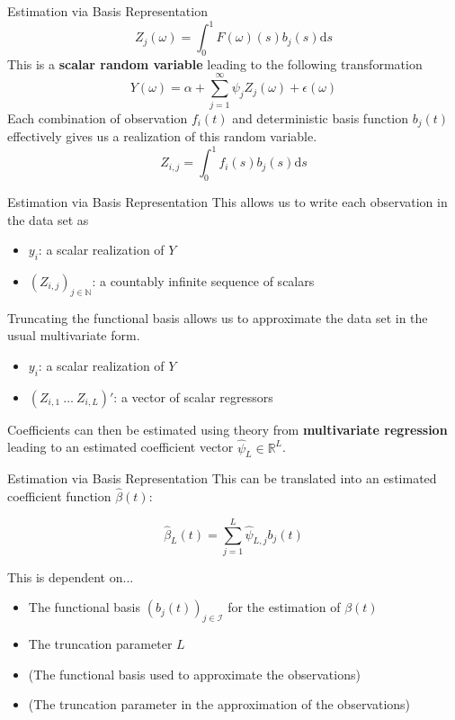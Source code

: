 \documentclass{beamer}
\begin{document}
	\begin{frame}{Estimation via Basis Representation}
		$$Z_j(\omega) = \int_{0}^{1} F(\omega)(s) b_j(s)\mathrm{d}s$$ 
		This is a \textbf{scalar random variable} leading to the following transformation
		$$Y(\omega) = \alpha + \sum_{j = 1}^{\infty} \psi_j Z_j(\omega) + \epsilon(\omega)$$
		Each combination of observation $f_i(t)$ and deterministic basis function $b_j(t)$ effectively gives us a realization of this random variable.
		$$Z_{i,j} = \int_{0}^{1} f_i(s) b_j(s)\mathrm{d}s$$
		
	\end{frame}

	\begin{frame}{Estimation via Basis Representation}
		This allows us to write each observation in the data set as
		\begin{itemize}
			\item $y_i$: a scalar realization of $Y$
			\item $\left(Z_{i,j}\right)_{j \in \mathbb{N}}$: a countably infinite sequence of scalars
		\end{itemize}
		\vspace{0.2cm}
		
		Truncating the functional basis allows us to approximate the data set in the usual multivariate form.
		\begin{itemize}
			\item $y_i$: a scalar realization of $Y$
			\item $\left(Z_{i,1} \: \dots \:  Z_{i,L} \right)'$: a vector of scalar regressors
		\end{itemize}
		\vspace{0.2cm}
		
		Coefficients can then be estimated using theory from \textbf{multivariate regression} leading to an estimated coefficient vector $\hat{\psi}_L \in \mathbb{R}^L$.
	\end{frame}

	\begin{frame}{Estimation via Basis Representation}
		This can be translated into an estimated coefficient function $\hat{\beta}(t)$:
		
		$$\hat{\beta}_L(t) = \sum_{j = 1}^{L} \hat{\psi}_{L,j} b_j(t)$$
		\vspace{0.2cm}
	
		This is dependent on...
		\begin{itemize}
			\item The functional basis $(b_j(t))_{j \in \mathcal{I}}$ for the estimation of $\beta(t)$
			\item The truncation parameter $L$
			\item (The functional basis used to approximate the observations)
			\item (The truncation parameter in the approximation of the observations)
		\end{itemize}
	\end{frame}
	
\end{document}
